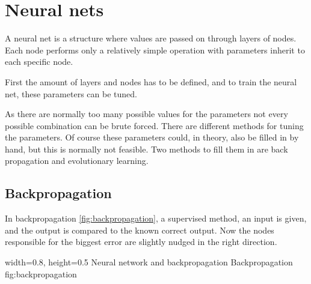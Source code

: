 \section{Neural nets} 
\label{sec:NN}
\cite[p727]{MA}
A neural net is a structure where values are passed on through layers of nodes. Each node performs only a relatively simple operation with parameters inherit to each specific node.

First the amount of layers and nodes has to be defined, and to train the neural net, these parameters can be tuned.

As there are normally too many possible values for the parameters not every possible combination can be brute forced. There are different methods for tuning the parameters. Of course these parameters could, in theory, also be filled in by hand, but this is normally not feasible. Two methods to fill them in are back propagation and evolutionary learning.

\subsection{Backpropagation}
In backpropagation \ref{fig:backpropagation}, a supervised method, an input is given, and the output is compared to the known correct output. Now the nodes responsible for the biggest error are slightly nudged in the right direction. 

    {width=0.8\textwidth, height=0.5\textheight} %
    {Neural network and backpropagation}   %
    {Backpropagation}   %
    {fig:backpropagation}    %